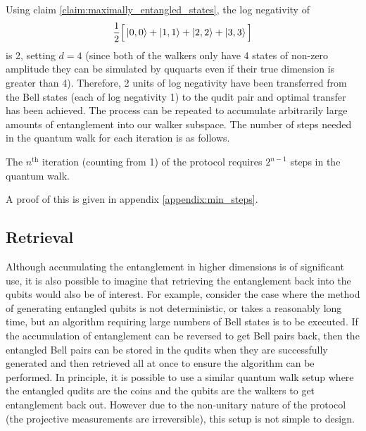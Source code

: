 Using claim \ref{claim:maximally_entangled_states}, the log negativity of
\begin{equation}
    \frac{1}{2}\Big[\ket{0,0} + \ket{1,1} + \ket{2,2} + \ket{3,3}\Big ]
\end{equation}
is 2, setting $d=4$ (since both of the walkers only have 4 states of non-zero amplitude they can be simulated by ququarts even if their true dimension is greater than 4).
Therefore, 2 units of log negativity have been transferred from the Bell states (each of log negativity 1) to the qudit pair and optimal transfer has been achieved.
The process can be repeated to accumulate arbitrarily large amounts of entanglement into our walker subspace.
The number of steps needed in the quantum walk for each iteration is as follows.
\begin{claim}
\label{claim:min_steps}
The $n^{\text{th}}$ iteration (counting from 1) of the protocol requires $2^{n-1}$ steps in the quantum walk.
\end{claim}
A proof of this is given in appendix \ref{appendix:min_steps}.

\subsection{Retrieval}
\label{subsection:qw_retrieval}
Although accumulating the entanglement in higher dimensions is of significant use, it is also possible to imagine that retrieving the entanglement back into the qubits would also be of interest.
For example, consider the case where the method of generating entangled qubits is not deterministic, or takes a reasonably long time, but an algorithm requiring large numbers of Bell states is to be executed.
If the accumulation of entanglement can be reversed to get Bell pairs back, then the entangled Bell pairs can be stored in the qudits when they are successfully generated and then retrieved all at once to ensure the algorithm can be performed.
In principle, it is possible to use a similar quantum walk setup where the entangled qudits are the coins and the qubits are the walkers to get entanglement back out.
However due to the non-unitary nature of the protocol (the projective measurements are irreversible), this setup is not simple to design.

